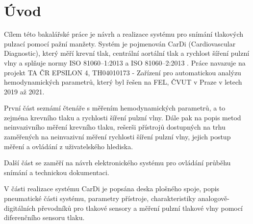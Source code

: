 \documentclass{ctuthesis}
\begin{document}
\maketitle



\chapter{Úvod}
Cílem této bakalářské práce je návrh a realizace systému pro snímání tlakových pulzací pomocí pažní manžety. Systém je pojmenován CarDi (Cardiovascular Diagnostic), který měří krevní tlak, centrální aortální tlak a rychlost šíření pulzní vlny a splňuje normy
ISO 81060–1:2013 a ISO 81060–2:2013 \cite{cite:Validation}.
Práce navazuje na projekt TA ČR EPSILON 4, TH04010173 - Zařízení pro automatickou analýzu hemodynamických parametrů, který byl řešen na FEL, ČVUT v Praze v letech 2019 až 2021.


\par
První část seznámí čtenáře s měřením hemodynamických parametrů, a to zejména krevního tlaku a rychlosti šíření pulzní vlny. Dále pak na popis metod neinvazivního měření krevního tlaku, rešerši přístrojů dostupných na trhu zaměřených na neinvazivní měření rychlosti šíření pulzní vlny, jejich postup měření a ovládání z uživatelského hlediska.
\par
Další část se zaměří na návrh elektronického systému pro ovládání průběhu snímání a technickou dokumentaci.
\par
V části realizace systému CarDi je popsána deska plošného spoje, popis pneumatické části systému, parametry přístroje, charakteristiky analogově-digitálních převodníků pro tlakové sensory a měření pulzní tlakové vlny pomocí diferenčního sensoru tlaku.








\end{document}
